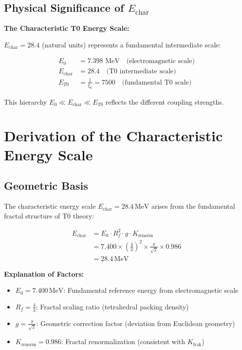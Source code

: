 \documentclass[12pt,a4paper]{article}
\begin{document}
	\subsection{Physical Significance of $E_{\text{char}}$}
	
	\begin{keyresult}
		\textbf{The Characteristic T0 Energy Scale:}
		
		$E_{\text{char}} = 28.4$ (natural units) represents a fundamental intermediate scale:
		
		\begin{align}
			E_0 &= 7.398 \text{ MeV} \quad \text{(electromagnetic scale)} \\
			E_{\text{char}} &= 28.4 \quad \text{(T0 intermediate scale)} \\
			E_{T0} &= \frac{1}{\xi_0} = 7500 \quad \text{(fundamental T0 scale)}
		\end{align}
		
		This hierarchy $E_0 \ll E_{\text{char}} \ll E_{T0}$ reflects the different coupling strengths.
	\end{keyresult}
	
	\section{Derivation of the Characteristic Energy Scale}
	
	\subsection{Geometric Basis}
	
	The characteristic energy scale $E_{\text{char}} = 28.4\,\text{MeV}$ arises from the fundamental fractal structure of T0 theory:
	
	\begin{align}
		E_{\text{char}} &= E_0 \cdot R_f^2 \cdot g \cdot K_{\text{renorm}} \\
		&= 7.400 \times \left(\frac{4}{3}\right)^2 \times \frac{\pi}{\sqrt{2}} \times 0.986 \\
		&= 28.4\,\text{MeV}
	\end{align}
	
	\textbf{Explanation of Factors:}
	\begin{itemize}
		\item $E_0 = 7.400\,\text{MeV}$: Fundamental reference energy from electromagnetic scale
		\item $R_f = \frac{4}{3}$: Fractal scaling ratio (tetrahedral packing density)  
		\item $g = \frac{\pi}{\sqrt{2}}$: Geometric correction factor (deviation from Euclidean geometry)
		\item $K_{\text{renorm}} = 0.986$: Fractal renormalization (consistent with $K_{\text{frak}}$)
	\end{itemize}
	
\end{document}
